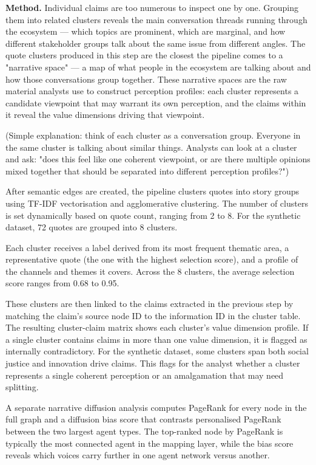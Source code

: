 \documentclass[11pt,a4paper]{article}
\begin{document}
\textbf{Method.} Individual claims are too numerous to inspect one by one.
Grouping them into related clusters reveals the main conversation threads
running through the ecosystem — which topics are prominent, which are
marginal, and how different stakeholder groups talk about the same issue
from different angles. The quote clusters produced in this step are the
closest the pipeline comes to a "narrative space" — a map of what people
in the ecosystem are talking about and how those conversations group
together. These narrative spaces are the raw material analysts use to
construct perception profiles: each cluster represents a candidate
viewpoint that may warrant its own perception, and the claims within it
reveal the value dimensions driving that viewpoint.

(Simple explanation: think of each cluster as a conversation group.
Everyone in the same cluster is talking about similar things. Analysts
can look at a cluster and ask: "does this feel like one coherent
viewpoint, or are there multiple opinions mixed together that should be
separated into different perception profiles?")

After semantic edges are created, the pipeline clusters quotes into
story groups using TF-IDF vectorisation and agglomerative clustering.
The number of clusters is set dynamically based on quote count, ranging
from 2 to 8. For the synthetic dataset, 72 quotes are grouped into 8
clusters.

Each cluster receives a label derived from its most frequent thematic
area, a representative quote (the one with the highest selection score),
and a profile of the channels and themes it covers. Across the 8
clusters, the average selection score ranges from 0.68 to 0.95.

These clusters are then linked to the claims extracted in the previous
step by matching the claim's source node ID to the information ID in the
cluster table. The resulting cluster-claim matrix shows each cluster's
value dimension profile. If a single cluster contains claims in more
than one value dimension, it is flagged as internally contradictory. For
the synthetic dataset, some clusters span both social justice and
innovation drive claims. This flags for the analyst whether a cluster
represents a single coherent perception or an amalgamation that may need
splitting.

A separate narrative diffusion analysis computes PageRank for every node
in the full graph and a diffusion bias score that contrasts personalised
PageRank between the two largest agent types. The top-ranked node by
PageRank is typically the most connected agent in the mapping layer,
while the bias score reveals which voices carry further in one agent
network versus another.
\end{document}
